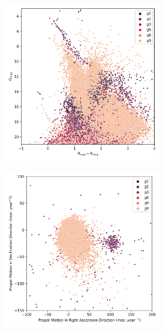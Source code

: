 \documentclass[11pt, a4paper, english]{book}
\begin{document}
\begin{figure}[H]
\begin{subfigure}{0.9\textwidth}
\begin{subfigure}[t]{0.30\textwidth}
    \end{subfigure}
    \hfill
    \begin{subfigure}[t]{0.30\textwidth}
      \centering
      \includegraphics[width=\textwidth]{../figures/melotte_25/dec_hr_diagram_melotte_25.png}
    \end{subfigure}
  \end{subfigure}
  \caption{Melotte 25 DEC characterization.}
  \centering
  \begin{subfigure}{0.9\textwidth}
    \centering
    \begin{subfigure}[t]{0.30\textwidth}
      \centering
      \includegraphics[width=\textwidth]{../figures/melotte_25/dec_pm_filtered_melotte_25.png}

\end{subfigure}
\end{subfigure}
\end{figure}
\end{document}
